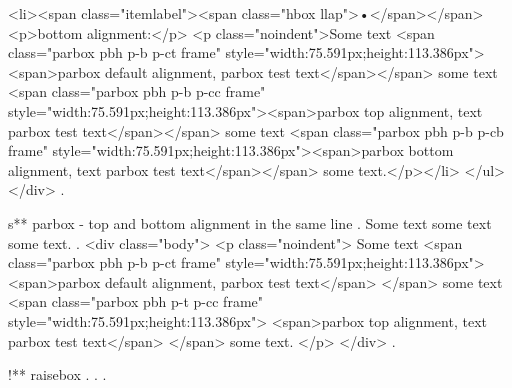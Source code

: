 <li><span class="itemlabel"><span class="hbox llap">•</span></span>
<p>bottom alignment:</p>
<p class="noindent">Some text <span class="parbox pbh p-b p-ct frame" style="width:75.591px;height:113.386px"><span>parbox default alignment, parbox test text</span></span> some text <span class="parbox pbh p-b p-cc frame" style="width:75.591px;height:113.386px"><span>parbox top alignment, text parbox test text</span></span> some text <span class="parbox pbh p-b p-cb frame" style="width:75.591px;height:113.386px"><span>parbox bottom alignment, text parbox test text</span></span> some text.</p></li>
</ul>
</div>
.


s** parbox - top and bottom alignment in the same line
.
\noindent
Some text
some text
some text.
.
<div class="body">
<p class="noindent">
Some text <span class="parbox pbh p-b p-ct frame" style="width:75.591px;height:113.386px">
<span>parbox default alignment, parbox test text</span>
</span> some text <span class="parbox pbh p-t p-cc frame" style="width:75.591px;height:113.386px">
<span>parbox top alignment, text parbox test text</span>
</span> some text.
</p>
</div>
.


!** raisebox
.
.
.
